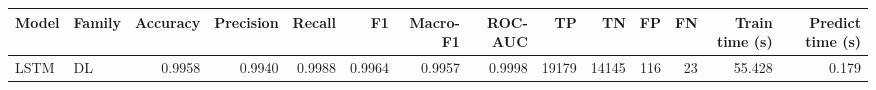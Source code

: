 \begin{tabular}{llrrrrrrrrrrrr}
\toprule
Model & Family & Accuracy & Precision & Recall & F1 & Macro-F1 & ROC-AUC & TP & TN & FP & FN & Train time (s) & Predict time (s) \\
\midrule
LSTM & DL & 0.9958 & 0.9940 & 0.9988 & 0.9964 & 0.9957 & 0.9998 & 19179 & 14145 & 116 & 23 & 55.428 & 0.179 \\
\bottomrule
\end{tabular}

